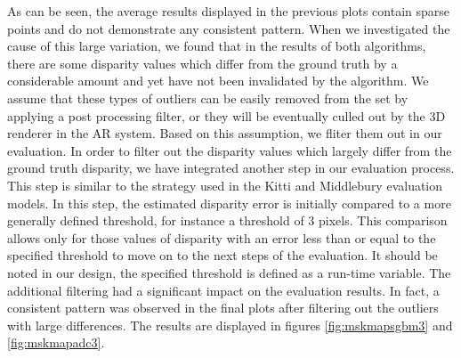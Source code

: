 As can be seen, the average results displayed in the previous plots contain sparse points and 
do not demonstrate any consistent pattern. When we investigated the cause of this large variation, we found that in
the results of both algorithms, there are some disparity values which differ from the ground truth 
by a considerable amount and yet have not been invalidated by the
algorithm. We assume that these types of outliers can be easily removed from the set by applying a post processing filter, or 
they will be eventually culled out by the 3D renderer in the AR system. Based on this assumption, we fliter them out in our evaluation.
In order to filter out the disparity values which largely differ from the ground truth disparity, we have integrated another 
step in our evaluation process. This step is similar to the strategy used in the Kitti and Middlebury evaluation models.
In this step, the estimated disparity error is initially compared to a more generally defined threshold, for instance a threshold of 3 pixels.
This comparison allows only for those values of disparity with an error less than or equal to the specified threshold to 
move on to the next steps of the evaluation. It should be noted in our design, the specified threshold is defined as a run-time variable. \newline
The additional filtering had a significant impact on the evaluation results. In fact, a consistent pattern was observed in the final plots after filtering out the
outliers with large differences. The results are displayed in
figures \ref{fig:mskmapsgbm3} and \ref{fig:mskmapadc3}.

